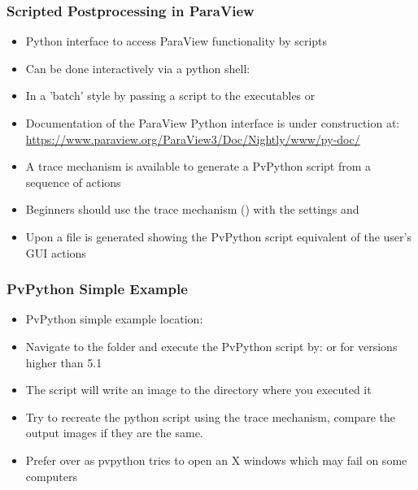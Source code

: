 \begin{frame}

  \frametitle{Scripted Postprocessing in ParaView}

  \begin{itemize}

    \item Python interface to access ParaView functionality by scripts

    \item Can be done interactively via a python shell:  

    \item In a 'batch' style by passing a script to the executables  or  

    \item Documentation of the ParaView Python interface is under construction at:
      \url{https://www.paraview.org/ParaView3/Doc/Nightly/www/py-doc/}

    \item A trace mechanism is available to generate a PvPython script from a sequence of actions

    \item Beginners should use the trace mechanism () with the settings  and  

    \item Upon  a file is generated showing the PvPython script equivalent of the user's GUI actions
  \end{itemize}

\end{frame}

\begin{frame}

  \frametitle{PvPython Simple Example}

  \begin{itemize}
      \item PvPython simple example location: 

      \item Navigate to the folder and execute the PvPython script by:  or for versions higher than 5.1

      \item The script will write an image  to the directory where you executed it 
      \item {} Try to recreate the python script using the trace mechanism, compare the output images if they are the same.

      \item {} Prefer  over  as pvpython tries to open an X windows which may fail on some computers    
  \end{itemize}

\end{frame}

